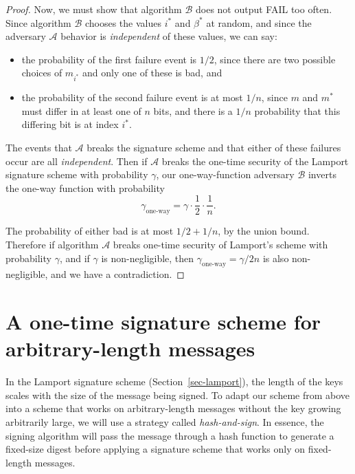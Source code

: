\documentclass[
  letterpaper,
]{scrbook}
\providecommand{\tightlist}{%
  \setlength{\itemsep}{0pt}\setlength{\parskip}{0pt}}
\newcommand{\calA}{\mathcal{A}}
\newcommand{\calB}{\mathcal{B}}
\theoremstyle{definition}
\theoremstyle{plain}
\theoremstyle{plain}
\theoremstyle{remark}
\begin{document}
\begin{proof}
Now, we must show that algorithm \(\calB\) does not output FAIL too
often. Since algorithm \(\calB\) chooses the values \(i^*\) and
\(\beta^*\) at random, and since the adversary \(\calA\) behavior is
\emph{independent} of these values, we can say:

\begin{itemize}
\tightlist
\item
  the probability of the first failure event is \(1/2\), since there are
  two possible choices of \(m_{i^*}\) and only one of these is bad, and
\item
  the probability of the second failure event is at most \(1/n\), since
  \(m\) and \(m^*\) must differ in at least one of \(n\) bits, and there
  is a \(1/n\) probability that this differing bit is at index \(i^*\).
\end{itemize}

The events that \(\calA\) breaks the signature scheme and that either of
these failures occur are all \emph{independent}. Then if \(\calA\)
breaks the one-time security of the Lamport signature scheme with
probability \(\gamma\), our one-way-function adversary \(\calB\) inverts
the one-way function with probability
\[ \gamma_\text{one-way} = \gamma \cdot \frac{1}{2} \cdot \frac{1}{n}.\]

The probability of either bad is at most \(1/2 + 1/n\), by the union
bound. Therefore if algorithm \(\calA\) breaks one-time security of
Lamport's scheme with probability \(\gamma\), and if \(\gamma\) is
non-negligible, then \(\gamma_\text{one-way} = \gamma/2n\) is also
non-negligible, and we have a contradiction.
\end{proof}

\section{A one-time signature scheme for arbitrary-length
messages}\label{a-one-time-signature-scheme-for-arbitrary-length-messages}

In the Lamport signature scheme (Section~\ref{sec-lamport}), the length
of the keys scales with the size of the message being signed. To adapt
our scheme from above into a scheme that works on arbitrary-length
messages without the key growing arbitrarily large, we will use a
strategy called \emph{hash-and-sign}. In essence, the signing algorithm
will pass the message through a hash function to generate a fixed-size
digest before applying a signature scheme that works only on
fixed-length messages.
\end{document}
